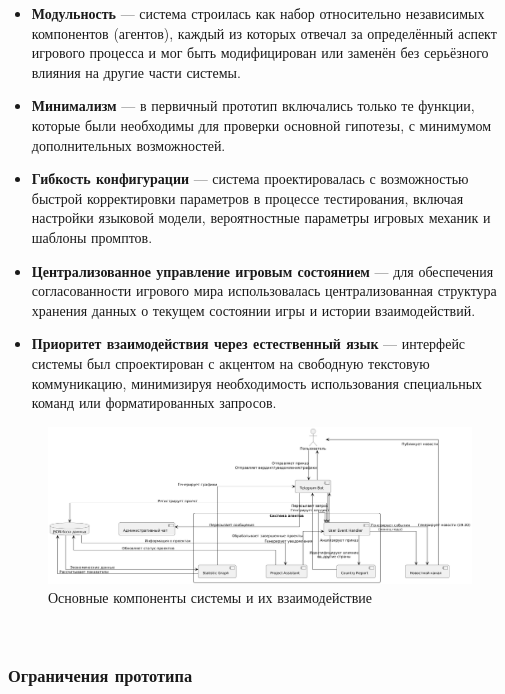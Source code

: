\begin{itemize}
    \item \textbf{Модульность} — система строилась как набор относительно независимых компонентов (агентов), каждый из которых отвечал за определённый аспект игрового процесса и мог быть модифицирован или заменён без серьёзного влияния на другие части системы.

    \item \textbf{Минимализм} — в первичный прототип включались только те функции, которые были необходимы для проверки основной гипотезы, с минимумом дополнительных возможностей.

    \item \textbf{Гибкость конфигурации} — система проектировалась с возможностью быстрой корректировки параметров в процессе тестирования, включая настройки языковой модели, вероятностные параметры игровых механик и шаблоны промптов.

    \item \textbf{Централизованное управление игровым состоянием} — для обеспечения согласованности игрового мира использовалась централизованная структура хранения данных о текущем состоянии игры и истории взаимодействий.

    \item \textbf{Приоритет взаимодействия через естественный язык} — интерфейс системы был спроектирован с акцентом на свободную текстовую коммуникацию, минимизируя необходимость использования специальных команд или форматированных запросов.
\end{itemize}
\begin{figure}[h]
    \centering
    \includegraphics[width=\textwidth]{figures/agents.png}
    \caption{Основные компоненты системы и их взаимодействие}
    \label{fig:agents}
\end{figure}\\
\subsubsection{Ограничения прототипа}

